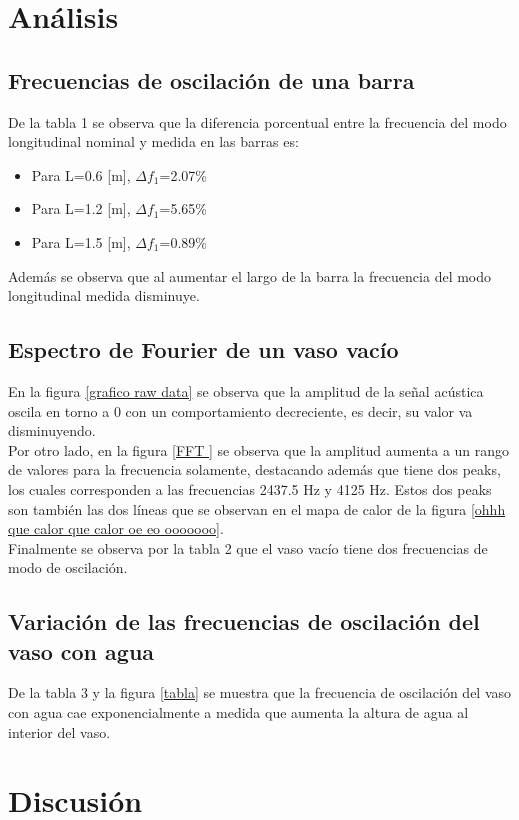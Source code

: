 \documentclass[letterpaper,11pt]{article} %
\begin{document}
\newpage \section{Análisis}
\subsection{Frecuencias de oscilación de una barra}
De la tabla 1 se observa que la diferencia porcentual entre la frecuencia del modo longitudinal nominal y medida en las barras es:
\begin{itemize}
    \item Para L=0.6 [m], $\Delta f_1$=2.07\%
    \item Para L=1.2 [m], $\Delta f_1$=5.65\%
    \item Para L=1.5 [m], $\Delta f_1$=0.89\%
\end{itemize}
Además se observa que al aumentar el largo de la barra la frecuencia del modo longitudinal medida disminuye.
\subsection{Espectro de Fourier de un vaso vacío}
En la figura \ref{grafico raw data} se observa que la amplitud de la señal acústica oscila en torno a 0 con un comportamiento decreciente, es decir, su valor va disminuyendo.\\ 

Por otro lado, en la figura \ref{FFT } se observa que la amplitud aumenta a un rango de valores para la frecuencia solamente, destacando además que tiene dos peaks, los cuales corresponden a las frecuencias 2437.5 Hz y 4125 Hz. Estos dos peaks son también las dos líneas que se observan en el mapa de calor de la figura \ref{ohhh que calor que calor oe eo ooooooo}.\\ 

Finalmente se observa por la tabla 2 que el vaso vacío tiene dos frecuencias de modo de oscilación.
\subsection{Variación de las frecuencias de oscilación del vaso con agua }
De la tabla 3 y la figura \ref{tabla} se muestra que la frecuencia de oscilación del vaso con agua cae exponencialmente a medida que aumenta la altura de agua al interior del vaso.
\newpage \section{Discusión}
\end{document}
